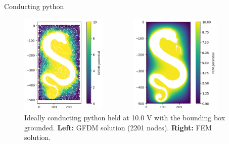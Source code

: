 \documentclass{beamer}
\begin{document}
\begin{frame}{Conducting python}
\begin{figure}[h]
\begin{columns}
    \begin{column}{0.5\linewidth}
        \centering
        \includegraphics[width=0.80\textwidth]{Figures/Python_GFDM.png}
    \end{column}
    \begin{column}{0.5\linewidth}
        \centering
        \includegraphics[width=0.80\textwidth]{Figures/Python_FEM.png}
    \end{column}
\end{columns}
\caption{Ideally conducting python held at 10.0 V with the bounding box grounded. \textbf{Left:} GFDM solution (2201 nodes). \textbf{Right:} FEM solution.}
\label{fig:python}
\end{figure}
\end{frame}
\end{document}
